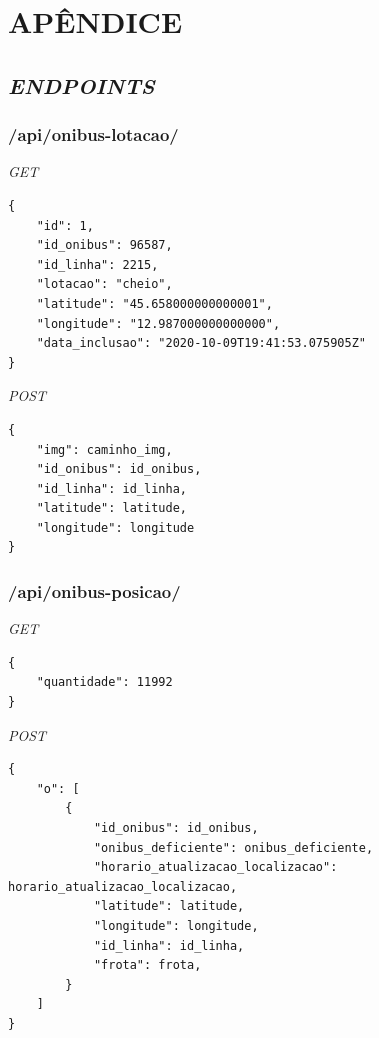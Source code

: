 \chapter{APÊNDICE}
 \label{app:apendiceA}
\section{\textit{ENDPOINTS}}
\subsection{/api/onibus-lotacao/}
\textit{GET}
\begin{lstlisting}
{
    "id": 1,
    "id_onibus": 96587,
    "id_linha": 2215,
    "lotacao": "cheio",
    "latitude": "45.658000000000001",
    "longitude": "12.987000000000000",
    "data_inclusao": "2020-10-09T19:41:53.075905Z"
}    
\end{lstlisting}
\textit{POST}
\begin{lstlisting}
{
    "img": caminho_img,
    "id_onibus": id_onibus,
    "id_linha": id_linha,
    "latitude": latitude,
    "longitude": longitude            
}
\end{lstlisting}
\subsection{/api/onibus-posicao/}
\textit{GET}
\begin{lstlisting}
{
    "quantidade": 11992
}
\end{lstlisting}
\textit{POST}
\begin{lstlisting}
{
    "o": [
        {
            "id_onibus": id_onibus,
            "onibus_deficiente": onibus_deficiente,
            "horario_atualizacao_localizacao": horario_atualizacao_localizacao,
            "latitude": latitude,
            "longitude": longitude,
            "id_linha": id_linha,
            "frota": frota,
        }
    ]
}
\end{lstlisting}
